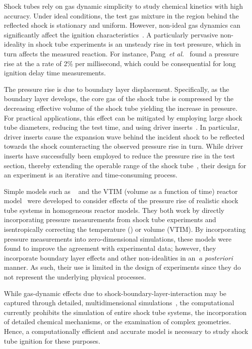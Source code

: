 	Shock tubes rely on gas dynamic simplicity to study chemical kinetics with high accuracy. Under ideal conditions, the test gas mixture 
	in the region behind the reflected shock is stationary and uniform. However, non-ideal gas dynamics can significantly affect the ignition characteristics~\cite{PETERSEN_HANSON_SW2001}. A particularly pervasive non-ideality in shock tube experiments is an unsteady rise in test pressure, which in turn affects the measured reaction. For instance, Pang~\emph{et al.}~\cite{PANG_DAVIDSON_HANSON_PCI32} found a pressure rise at the a rate of 2\% per millisecond, which could be consequential for long ignition delay time measurements.
	
	
	The pressure rise is due to boundary layer displacement. Specifically, as the boundary layer develops, the core gas of the shock tube is compressed by the decreasing effective volume of the shock tube yielding the increase in pressure. For practical applications, this effect can be mitigated by employing large shock tube diameters, reducing the test time, and using driver inserts~\cite{DAVIDSON_HANSON_SW2009}. In particular, driver inserts cause the expansion wave behind the incident shock to be reflected towards the shock counteracting the observed pressure rise in turn. While driver inserts have successfully been employed to reduce the pressure rise in the test section, thereby extending the operable range of the shock tube~\cite{HONG_PANG_VASU_DAVIDSON_HANSON_SW2009}, their design for an experiment is an iterative and time-consuming process.  
	
Simple models such as {}~\cite{LI_OWENS_DAVIDSON_HANSON_IJCK2008} and the VTIM (volume as a function of time) reactor model~\cite{CHAOS_DRYER_IJCK2010} were developed to consider effects of the pressure rise of realistic shock tube systems in homogeneous reactor models. They both work by directly incorporating pressure measurements from shock tube experiments and isentropically correcting the temperature ({}) or volume (VTIM). By incorporating pressure measurements into zero-dimensional simulations, these models were found to improve the agreement with experimental data; however, they incorporate boundary layer effects and other non-idealities in an~\emph{a posteriori} manner. As such, their use is limited in the design of experiments since they do not represent the underlying physical processes.
	
	While gas-dynamic effects due to shock-boundary-layer-interaction may be captured through detailed, multidimensional simulations~\cite{WEBER_ORAN_BORIS_ANDERSON_POF1995,YAMASHITA_CF12,GROGAN_PCI2015,Khokhlov_ICDERS15,GROGAN_PCI2017,LIPKOWICZ_SW2018}, the computational currently prohibits the simulation of entire shock tube systems, the incorporation of detailed chemical mechanisms, or the examination of complex geometries. Hence, a computationally efficient and accurate model is necessary to study shock tube ignition for these purposes. 
	
